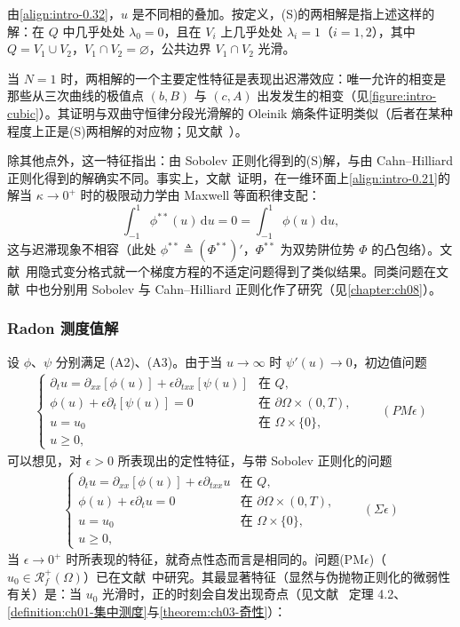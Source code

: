 \documentclass[../main.tex]{subfiles}
\begin{document}
\begin{remark}\label{remark:intro-0.3.1}
由\eqref{align:intro-0.32}，$u$ 是不同相的叠加。按定义，(S)的两相解是指上述这样的解：在 $Q$ 中几乎处处 $\lambda_0=0$，且在 $V_i$ 上几乎处处 $\lambda_i=1$（$i=1,2$），其中 $Q=V_1\cup V_2$，$V_1\cap V_2=\varnothing $，公共边界 $V_1\cap V_2$ 光滑。

当 $N=1$ 时，两相解的一个主要定性特征是表现出迟滞效应：唯一允许的相变是那些从三次曲线的极值点 $(b,B)$ 与 $(c,A)$ 出发发生的相变（见\cref{figure:intro-cubic}）。其证明与双曲守恒律分段光滑解的 Oleinik 熵条件证明类似（后者在某种程度上正是(S)两相解的对应物；见文献~\cite{ref48,ref54,ref70,ref71,ref82,ref83,ref84,ref98}）。

除其他点外，这一特征指出：由 Sobolev 正则化得到的(S)解，与由 Cahn--Hilliard 正则化得到的解确实不同。事实上，文献~\cite{ref12}证明，在一维环面上\eqref{align:intro-0.21}的解当 $\kappa\to0^+$ 时的极限动力学由 Maxwell 等面积律支配：
\[
\int_{-1}^1\phi^{**}(u)\,\mathrm{d}u = 0 = \int_{-1}^1\phi(u)\,\mathrm{d}u,
\]
这与迟滞现象不相容（此处 $\phi^{**}\triangleq (\Phi^{**})'$，$\Phi^{**}$ 为双势阱位势 $\Phi$ 的凸包络）。文献~\cite{ref43}用隐式变分格式就一个梯度方程的不适定问题得到了类似结果。同类问题在文献~\cite{ref30,ref95}中也分别用 Sobolev 与 Cahn--Hilliard 正则化作了研究（见\cref{chapter:ch08}）。
\end{remark}

\subsubsection*{Radon 测度值解}\label{subsubsection:intro-radonfb}

设 $\phi$、$\psi$ 分别满足 (A2)、(A3)。由于当 $u\to\infty$ 时 $\psi'(u)\to0$，初边值问题
\begin{align*}
\begin{cases}
\partial_t u = \partial_{xx}[\phi(u)] + \epsilon\partial_{txx}[\psi(u)] & \text{在 }Q,\\
\phi(u) + \epsilon\partial_t[\psi(u)] = 0 & \text{在 }\partial\Omega\times(0,T),\\
u=u_0 & \text{在 }\Omega\times\{0\},\\
u\geqslant0,
\end{cases}
\qquad(PM\epsilon)
\end{align*}
可以想见，对 $\epsilon>0$ 所表现出的定性特征，与带 Sobolev 正则化的问题
\begin{align*}
\begin{cases}
\partial_t u = \partial_{xx}[\phi(u)] + \epsilon\partial_{txx}u & \text{在 }Q,\\
\phi(u) + \epsilon\partial_t u = 0 & \text{在 }\partial\Omega\times(0,T),\\
u=u_0 & \text{在 }\Omega\times\{0\},\\
u\geqslant0,
\end{cases}
\qquad(\Sigma\epsilon)
\end{align*}
当 $\epsilon\to0^+$ 时所表现的特征，就奇点性态而言是相同的。问题(PM$\epsilon$)（$u_0\in\mathscr{R}^+_f(\Omega)$）已在文献~\cite{ref99,ref100}中研究。其最显著特征（显然与伪抛物正则化的微弱性有关）是：当 $u_0$ 光滑时，正的时刻会自发出现奇点（见文献~\cite{ref22} 定理 4.2、\cref{definition:ch01-集中测度}与\cref{theorem:ch03-奇性}）：
\end{document}
